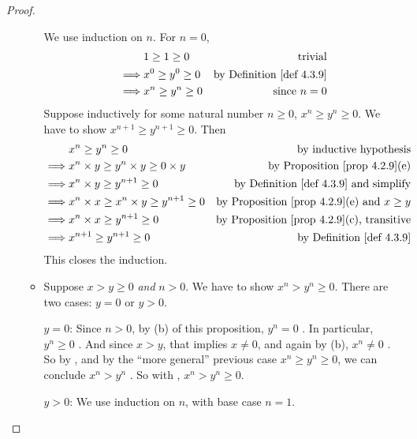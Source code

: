 \begin{proof}
\begin{enumerate}
\begin{itemize}
                We use induction on \(n\).
                For \(n = 0\),
                \begin{align*}
                             & 1 \ge 1 \ge 0 & \text{trivial} \\
                    \implies & x^0 \ge y^0 \ge 0 & \text{by \DEF{4.3.9}} \\
                    \implies & x^n \ge y^n \ge 0 & \text{since \(n = 0\)}
                \end{align*}
                Suppose inductively for some natural number \(n \ge 0\), \(x^n \ge y^n \ge 0\).
                We have to show \(x^{n + 1} \ge y^{n + 1} \ge 0\).
                Then
                \begin{align*}
                             & x^n \ge y^n \ge 0 & \text{by inductive hypothesis} \\
                    \implies & x^n \X y \ge y^n \X y \ge 0 \X y & \text{by \PROP{4.2.9}(e)} \\
                    \implies & x^n \X y \ge y^{n + 1} \ge 0 & \text{by \DEF{4.3.9} and simplify} \\
                    \implies & x^n \X x \ge x^n \X y \ge y^{n + 1} \ge 0 & \text{by \PROP{4.2.9}(e) and \(x \ge y\)} \\
                    \implies & x^n \X x \ge y^{n + 1} \ge 0 & \text{by \PROP{4.2.9}(c), transitive} \\
                    \implies & x^{n + 1} \ge y^{n + 1} \ge 0 & \text{by \DEF{4.3.9}}
                \end{align*}
                This closes the induction.
            \item
                Suppose \(x > y \ge 0\) \emph{and} \(n > 0\). We have to show \(x^n > y^n \ge 0\).
                There are two cases: \(y = 0\) or \(y > 0\).
                
                \(y = 0\): Since \(n > 0\), by (b) of this proposition, \(y^n = 0\) .
                In particular, \(y^n \ge 0\) .
                And since \(x > y\), that implies \(x \neq 0\), and again by (b), \(x^n \neq 0\) .
                So by , and by the ``more general'' previous case \(x^n \ge y^n \ge 0\), we can conclude \(x^n > y^n\) .
                So with , \(x^n > y^n \ge 0\).
                
                \(y > 0\): We use induction on \(n\), with base case \(n = 1\).
                

\end{itemize}
\end{enumerate}
\end{proof}
